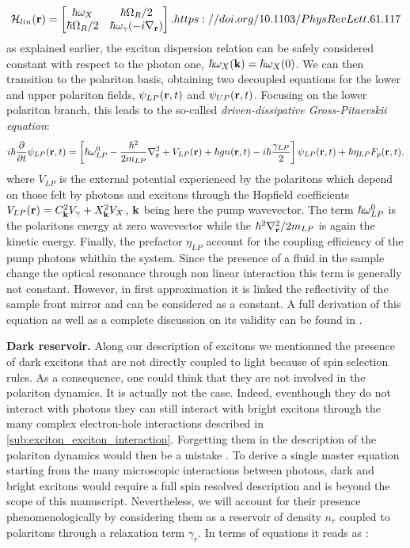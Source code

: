 \begin{equation}
    \mathcal{H}_{lin}(\mathbf{r})
    = 
    \begin{bmatrix}
    \hbar \omega_X & \hbar \Omega_R / 2 \\
    \hbar \Omega_R / 2 & \hbar \omega_\gamma(-i \nabla_{\mathbf{r}})  
    \end{bmatrix}. https://doi.org/10.1103/PhysRevLett.61.117
\end{equation}
as explained earlier, the exciton dispersion relation can be safely considered constant with respect to the photon one, $\hbar \omega_X(\mathbf{k})=\hbar \omega_X(0)$.
We can then transition to the polariton basis, obtaining two decoupled equations for the lower and upper polariton fields, $\psi_{LP}(\mathbf{r},t)$ and $\psi_{UP}(\mathbf{r},t)$. Focusing on the lower polariton branch, this leads to the so-called \textit{driven-dissipative Gross-Pitaevskii equation}:
\begin{equation}
    i \hbar \dfrac{\partial}{\partial t} \psi_{LP}(\mathbf{r}, t) = \left[ \hbar \omega_{LP}^0 -\dfrac{\hbar^2}{2 m_{LP}}\nabla_{\mathbf{r}}^2 + V_{LP}(\mathbf{r}) + \hbar g n(\mathbf{r}, t) - i \hbar \dfrac{\gamma_{LP}}{2} \right] \psi_{LP}(\mathbf{r}, t) + \hbar \eta_{LP} F_p(\mathbf{r}, t).
    \label{eq:generalized_GPE}
\end{equation}
where $V_{LP}$ is the external potential experienced by the polaritons which depend on those felt by photons and excitons through the Hopfield 
coefficients $V_{LP}(\mathbf{r}) = C^2_{\mathbf{k}} V_{\gamma} + X^2_{\mathbf{k}} V_{X}$, $\mathbf{k}$ being here the pump wavevector. The term $\hbar \omega_{LP}^0$ is the polaritons energy at zero wavevector while the $\hbar^2\nabla^2_{\mathbf{r}} /2m_{LP}$ is again the kinetic energy. Finally, the prefactor $\eta_{LP}$ account for the coupling efficiency of the pump photons whithin the system.
Since the presence of a fluid in the sample change the optical resonance through non linear interaction this term is generally not constant. However, in first approximation it is linked the reflectivity of the sample front mirror and can be considered as a constant. A full derivation of this equation as well as a complete discussion on its validity can be found in \cite{carusotto_quantum_2013}.

\bigskip


\textbf{Dark reservoir. }Along our description of excitons we mentionned the presence of dark excitons that are not directly coupled to light because of spin selection rules. As a consequence, one could think 
that they are not involved in the polariton dynamics. It is actually not the case. Indeed, eventhough they do not interact with photons they can still interact with bright excitons through the many complex electron-hole interactions described in \autoref{sub:exciton_exciton_interaction}.
Forgetting them in the description of the polariton dynamics would then be a mistake \cite{Menard2014, stepanov_dispersion_2019}. To derive a single master equation starting from the many microscopic interactions between photons, dark and bright excitons would require a full spin resolved description and is beyond the scope of this manuscript.
Nevertheless, we will account for their presence phenomenologically by considering them as a reservoir of density $n_r$ coupled to polaritons through a relaxation term $\gamma_{r}$. In terms of equations it reads as :


